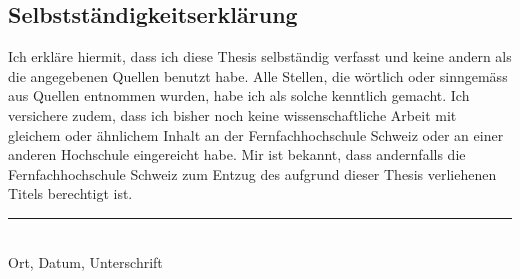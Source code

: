 \documentclass{ffhsthesis}
\begin{document}
\begin{appendix}


\chapter*{Selbstständigkeitserklärung}
Ich erkläre hiermit, dass ich diese Thesis selbständig verfasst 
und keine andern als die angegebenen Quellen benutzt habe. 
Alle Stellen, die wörtlich oder sinngemäss aus Quellen entnommen wurden, 
habe ich als solche kenntlich gemacht. Ich versichere zudem, dass ich bisher 
noch keine wissenschaftliche Arbeit mit gleichem oder ähnlichem Inhalt an der 
Fernfachhochschule Schweiz oder an einer anderen Hochschule eingereicht habe. 
Mir ist bekannt, dass andernfalls die Fernfachhochschule Schweiz zum Entzug 
des aufgrund dieser Thesis verliehenen Titels berechtigt ist.

\vspace{4cm}
\noindent
\hrule \ \\[-0.5ex]
Ort, Datum, Unterschrift




%


\end{appendix}
\end{document}
